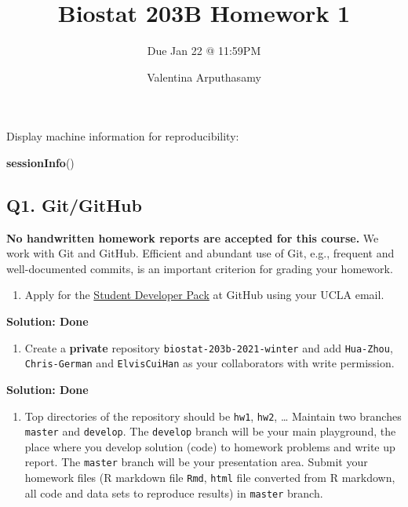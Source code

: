 \documentclass[
]{article}
\title{Biostat 203B Homework 1}
\subtitle{Due Jan 22 @ 11:59PM}
\author{Valentina Arputhasamy}
\date{}
\newenvironment{Shaded}{\begin{snugshade}}{\end{snugshade}}
\newcommand{\KeywordTok}[1]{\textcolor[rgb]{0.13,0.29,0.53}{\textbf{#1}}}
\newcommand{\NormalTok}[1]{#1}
\providecommand{\tightlist}{%
  \setlength{\itemsep}{0pt}\setlength{\parskip}{0pt}}
\begin{document}
\maketitle

Display machine information for reproducibility:

\begin{Shaded}
\begin{Highlighting}[]
\KeywordTok{sessionInfo}\NormalTok{()}
\end{Highlighting}
\end{Shaded}

\hypertarget{q1.-gitgithub}{%
\subsection{Q1. Git/GitHub}\label{q1.-gitgithub}}

\textbf{No handwritten homework reports are accepted for this course.}
We work with Git and GitHub. Efficient and abundant use of Git, e.g.,
frequent and well-documented commits, is an important criterion for
grading your homework.

\begin{enumerate}
\def\labelenumi{\arabic{enumi}.}
\tightlist
\item
  Apply for the \href{https://education.github.com/pack}{Student
  Developer Pack} at GitHub using your UCLA email.
\end{enumerate}

\textbf{Solution: Done}

\begin{enumerate}
\def\labelenumi{\arabic{enumi}.}
\setcounter{enumi}{1}
\tightlist
\item
  Create a \textbf{private} repository \texttt{biostat-203b-2021-winter}
  and add \texttt{Hua-Zhou}, \texttt{Chris-German} and
  \texttt{ElvisCuiHan} as your collaborators with write permission.
\end{enumerate}

\textbf{Solution: Done}

\begin{enumerate}
\def\labelenumi{\arabic{enumi}.}
\setcounter{enumi}{2}
\tightlist
\item
  Top directories of the repository should be \texttt{hw1},
  \texttt{hw2}, \ldots{} Maintain two branches \texttt{master} and
  \texttt{develop}. The \texttt{develop} branch will be your main
  playground, the place where you develop solution (code) to homework
  problems and write up report. The \texttt{master} branch will be your
  presentation area. Submit your homework files (R markdown file
  \texttt{Rmd}, \texttt{html} file converted from R markdown, all code
  and data sets to reproduce results) in \texttt{master} branch.
\end{enumerate}
\end{document}
